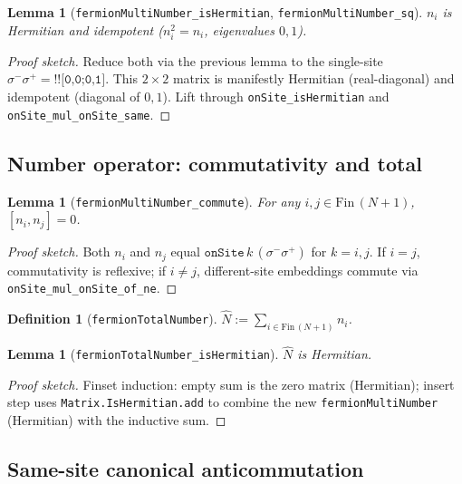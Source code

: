 \documentclass[a4paper,11pt]{article}
\newtheorem{lemma}[theorem]{Lemma}
\newtheorem{definition}[theorem]{Definition}
\begin{document}
\begin{lemma}[\texttt{fermionMultiNumber\_isHermitian},
            \texttt{fermionMultiNumber\_sq}]
$n_i$ is Hermitian and idempotent ($n_i^2 = n_i$, eigenvalues $0, 1$).
\end{lemma}

\begin{proof}[Proof sketch]
Reduce both via the previous lemma to the single-site
$\sigma^- \sigma^+ = \texttt{!![0,0;0,1]}$.  This $2 \times 2$
matrix is manifestly Hermitian (real-diagonal) and idempotent
(diagonal of $0, 1$).  Lift through \texttt{onSite\_isHermitian} and
\texttt{onSite\_mul\_onSite\_same}.
\end{proof}

\subsection{Number operator: commutativity and total}

\begin{lemma}[\texttt{fermionMultiNumber\_commute}]
For any $i, j \in \mathrm{Fin}\,(N+1)$, $[n_i, n_j] = 0$.
\end{lemma}

\begin{proof}[Proof sketch]
Both $n_i$ and $n_j$ equal $\texttt{onSite}\,k\,(\sigma^- \sigma^+)$
for $k = i, j$.  If $i = j$, commutativity is reflexive; if
$i \neq j$, different-site embeddings commute via
\texttt{onSite\_mul\_onSite\_of\_ne}.
\end{proof}

\begin{definition}[\texttt{fermionTotalNumber}]
$\hat N := \sum_{i \in \mathrm{Fin}\,(N+1)} n_i$.
\end{definition}

\begin{lemma}[\texttt{fermionTotalNumber\_isHermitian}]
$\hat N$ is Hermitian.
\end{lemma}

\begin{proof}[Proof sketch]
Finset induction: empty sum is the zero matrix (Hermitian); insert
step uses \texttt{Matrix.IsHermitian.add} to combine the new
\texttt{fermionMultiNumber} (Hermitian) with the inductive sum.
\end{proof}

\subsection{Same-site canonical anticommutation}
\end{document}
